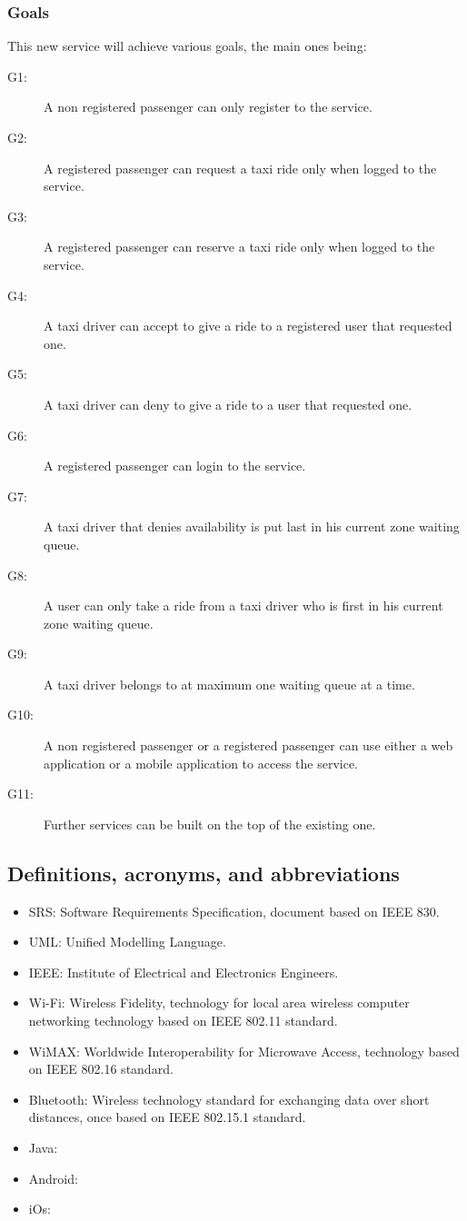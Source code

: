 \subsubsection{Goals}
This new service will achieve various goals, the main ones being:
\begin{description} %
	\item[G1:] A non registered passenger can only register to the service.
	\item[G2:] A registered passenger can request a taxi ride only when logged to the service.
	\item[G3:] A registered passenger can reserve a taxi ride only when logged to the service.
	\item[G4:] A taxi driver can accept to give a ride to a registered user that requested one.
	\item[G5:] A taxi driver can deny to give a ride to a user that requested one.
	\item[G6:] A registered passenger can login to the service.
	\item[G7:] A taxi driver that denies availability is put last in his current zone waiting queue.
	\item[G8:] A user can only take a ride from a taxi driver who is first in his current zone waiting queue.
	\item[G9:] A taxi driver belongs to at maximum one waiting queue at a time.
	\item[G10:] A non registered passenger or a registered passenger can use either a web application or a mobile application to access the service.
	\item[G11:] Further services can be built on the top of the existing one.
\end{description}
\subsection{Definitions, acronyms, and abbreviations}
\begin{itemize}
	\item SRS: Software Requirements Specification, document based on IEEE 830.
	\item UML: Unified Modelling Language.
	\item IEEE: Institute of Electrical and Electronics Engineers.
	\item Wi-Fi: Wireless Fidelity, technology for local area wireless computer networking technology based on IEEE 802.11 standard.
	\item WiMAX: Worldwide Interoperability for Microwave Access, technology based on IEEE 802.16 standard.
	\item Bluetooth: Wireless technology standard for exchanging data over short distances, once based on IEEE 802.15.1 standard.
	\item Java:
	\item Android:
	\item iOs:
\end{itemize}
